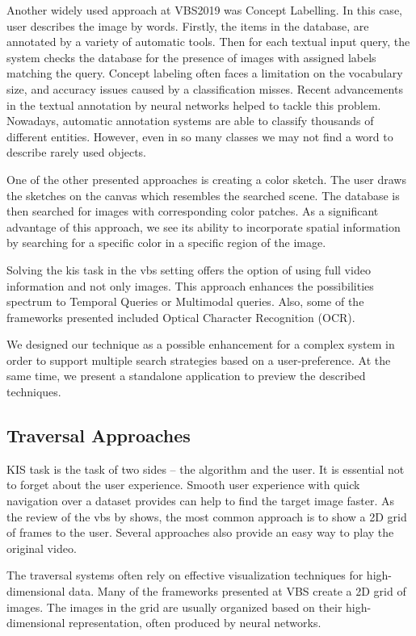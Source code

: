 Another widely used approach at VBS2019 was Concept Labelling. In this case, user describes the image by words. Firstly, the items in the database, are annotated by a variety of automatic tools. Then for each textual input query, the system checks the database for the presence of images with assigned labels matching the query. Concept labeling often faces a limitation on the vocabulary size, and accuracy issues caused by a classification misses. Recent advancements in the textual annotation by neural networks helped to tackle this problem. Nowadays, automatic annotation systems are able to classify thousands of different entities. However, even in so many classes we may not find a word to describe rarely used objects.

One of the other presented approaches is creating a color sketch. The user draws the sketches on the canvas which resembles the searched scene. The database is then searched for images with corresponding color patches. As a significant advantage of this approach, we see its ability to incorporate spatial information by searching for a specific color in a specific region of the image.
 
Solving the \acrshort{kis} task in the \acrshort{vbs} setting offers the option of using full video information and not only images. This approach enhances the possibilities spectrum to Temporal Queries or Multimodal queries. Also, some of the frameworks presented included Optical Character Recognition (OCR).

We designed our technique as a possible enhancement for a complex system in order to support multiple search strategies based on a user-preference. At the same time, we present a standalone application to preview the described techniques.

\subsection{Traversal Approaches}

KIS task is the task of two sides -- the algorithm and the user. It is essential not to forget about the user experience. Smooth user experience with quick navigation over a dataset provides can help to find the target image faster. As the review of the \acrshort{vbs} by \cite{rossetto2020interactive} shows, the most common approach is to show a 2D grid of frames to the user. Several approaches also provide an easy way to play the original video. 

The traversal systems often rely on effective visualization techniques for high-dimensional data. Many of the frameworks presented at VBS create a 2D grid of images. The images in the grid are usually organized based on their high-dimensional representation, often produced by neural networks. 



